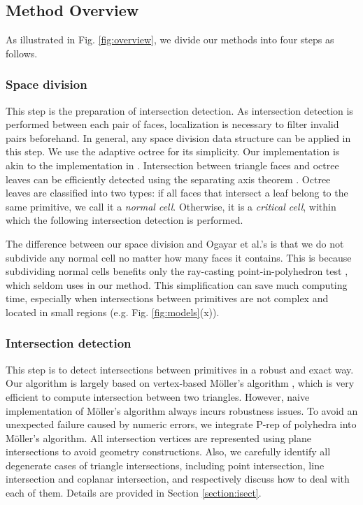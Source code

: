 \documentclass[10pt,journal,compsoc]{IEEEtran}
\begin{document}
\subsection{Method Overview}


As illustrated in Fig. \ref{fig:overview}, we divide our methods into four steps as follows.

\subsubsection{Space division}

This step is the preparation of intersection detection. As intersection detection is performed between each pair of faces, localization is necessary to filter invalid pairs beforehand. In general, any space division data structure can be applied in this step. We use the adaptive octree for its simplicity. Our implementation is akin to the implementation in \cite{ogayar2015deferred}. Intersection between triangle faces and octree leaves can be efficiently detected using the separating axis theorem \cite{gottschalk1996obbtree}. Octree leaves are classified into two types: if all faces that intersect a leaf belong to the same primitive, we call it a \emph{normal cell}. Otherwise, it is a \emph{critical cell}, within which the following intersection detection is performed.

The difference between our space division and Ogayar et al.'s is that we do not subdivide any normal cell no matter how many faces it contains. This is because subdividing normal cells benefits only the ray-casting point-in-polyhedron test  \cite{frisken2002simple}, which seldom uses in our method. This simplification can save much computing time, especially when intersections between primitives are not complex and located in small regions (e.g. Fig. \ref{fig:models}(x)).

\subsubsection{Intersection detection}

This step is to detect intersections between primitives in a robust and exact way. Our algorithm is largely based on vertex-based M\"{o}ller's algorithm \cite{moller1997fast}, which is very efficient to compute intersection between two triangles. However, naive implementation of M\"{o}ller's algorithm always incurs robustness issues. To avoid an unexpected failure caused by numeric errors, we integrate P-rep of polyhedra into M\"{o}ller's algorithm. All intersection vertices are represented using plane intersections to avoid geometry constructions. Also, we carefully identify all degenerate cases of triangle intersections, including point intersection, line intersection and coplanar intersection, and respectively discuss how to deal with each of them. Details are provided in Section \ref{section:isect}.
\end{document}
